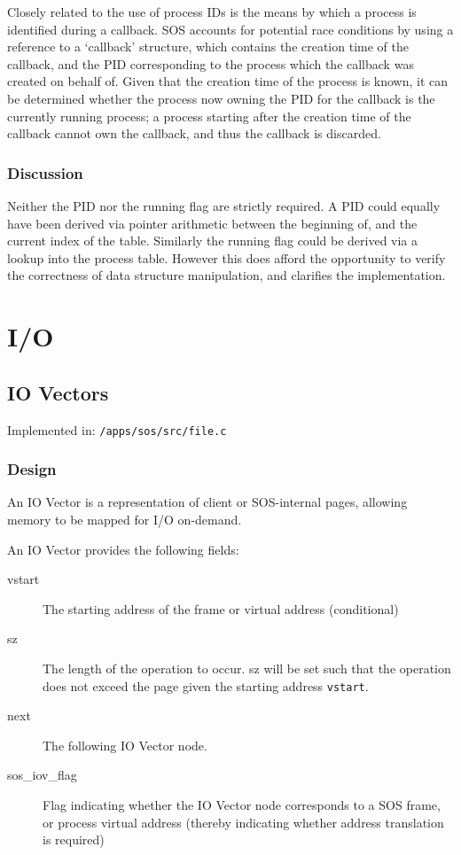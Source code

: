 \documentclass[a4paper,12pt]{article}
\begin{document}
Closely related to the use of process IDs is the means by which a process is
identified during a callback.  SOS accounts for potential race conditions by
using a reference to a `callback' structure, which contains the creation time
of the callback, and the PID corresponding to the process which the callback
was created on behalf of.  Given that the creation time of the process is
known, it can be determined whether the process now owning the PID for the
callback is the currently running process; a process starting after the
creation time of the callback cannot own the callback, and thus the callback
is discarded.

\subsubsection{Discussion}
Neither the PID nor the running flag are strictly required.  A PID could
equally have been derived via pointer arithmetic between the beginning of,
and the current index of the table.  Similarly the running flag could be
derived via a lookup into the process table.  However this does afford the
opportunity to verify the correctness of data structure manipulation, and
clarifies the implementation.

\section{I/O}
\subsection{IO Vectors}
Implemented in: \texttt{/apps/sos/src/file.c}

\subsubsection{Design}
An IO Vector is a representation of client or SOS-internal pages, allowing
memory to be mapped for I/O on-demand.

An IO Vector provides the following fields:
\begin{description}
\item[vstart] The starting address of the frame or virtual address (conditional)
\item[sz] The length of the operation to occur.  sz will be set such that the
  operation does not exceed the page given the starting address \texttt{vstart}.
\item[next] The following IO Vector node.
\item[sos\_iov\_flag] Flag indicating whether the IO Vector node corresponds to
  a SOS frame, or process virtual address (thereby indicating whether
  address translation is required)
\end{description}
\end{document}
